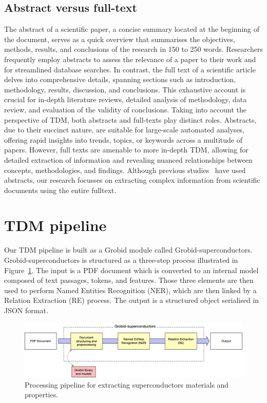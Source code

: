 \subsection{Abstract versus full-text}
The abstract of a scientific paper, a concise summary located at the beginning of the document, serves as a quick overview that summarises the objectives, methods, results, and conclusions of the research in 150 to 250 words. 
Researchers frequently employ abstracts to assess the relevance of a paper to their work and for streamlined database searches. 
In contrast, the full text of a scientific article delves into comprehensive details, spanning sections such as introduction, methodology, results, discussion, and conclusions. This exhaustive account is crucial for in-depth literature reviews, detailed analysis of methodology, data review, and evaluation of the validity of conclusions.
Taking into account the perspective of TDM, both abstracts and full-texts play distinct roles. Abstracts, due to their succinct nature, are suitable for large-scale automated analyses, offering rapid insights into trends, topics, or keywords across a multitude of papers. However, full texts are amenable to more in-depth TDM, allowing for detailed extraction of information and revealing nuanced relationships between concepts, methodologies, and findings. 
Although previous studies~\cite{yamaguchi-etal-2020-sc} have used abstracts, our research focusses on extracting complex information from scientific documents using the entire fulltext.


\section{TDM pipeline}
\label{subsubsec:document-structuring}

Our TDM pipeline is built as a Grobid module called Grobid-superconductors. 
Grobid-superconductors is structured as a three-step process illustrated in Figure~\ref{fig:pipeline-overview}. The input is a PDF document which is converted to an internal model composed of text passages, tokens, and features. Those three elements are then used to perform Named Entities Recognition (NER), which are then linked by a Relation Extraction (RE) process. 
The output is a structured object serialised in JSON format.

\begin{figure}[htbp]
    \includegraphics[width=\textwidth]{figures/automatic_extraction_supercon/schema-architecture-colors.png}
    \caption{Processing pipeline for extracting superconductors materials and properties. }
    \label{fig:pipeline-overview}
\end{figure}

